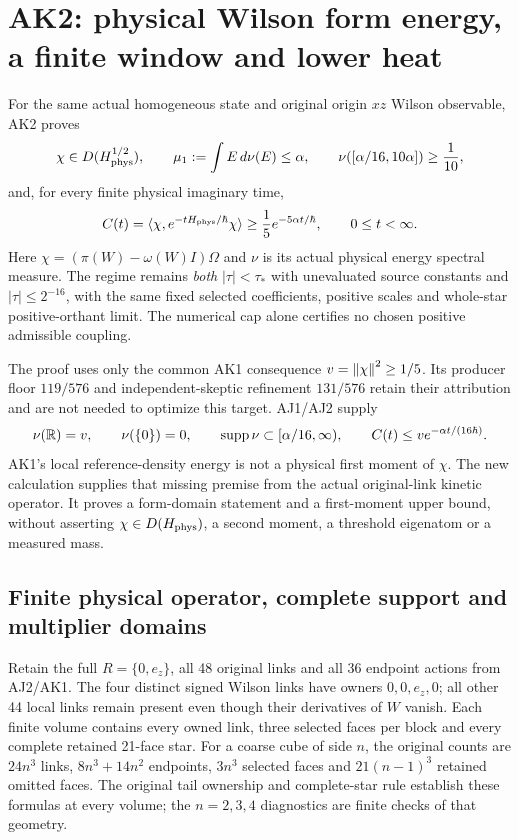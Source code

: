 \section{AK2: physical Wilson form energy, a finite window and lower heat\workstar}
\label{sec:ak2}
For the same actual homogeneous state and original origin $xz$ Wilson observable, AK2 proves
\begin{equation}
 \chi\in D(H_{\rm phys}^{1/2}),\qquad
 \mu_1:=\int E\,d\nu(E)\le\alpha,\qquad
 \nu([\alpha/16,10\alpha])\ge\frac1{10},
 \label{eq:ak2-targets}
\end{equation}
and, for every finite physical imaginary time,
\begin{equation}
 C(t)=\langle\chi,e^{-tH_{\rm phys}/\hbar}\chi\rangle
 \ge\frac15e^{-5\alpha t/\hbar},\qquad0\le t<\infty.
 \label{eq:ak2-lower-heat}
\end{equation}
Here $\chi=(\pi(W)-\omega(W)I)\Omega$ and $\nu$ is its actual physical energy spectral measure. The regime remains \emph{both} $|\tau|<\tau_*$ with unevaluated source constants and $|\tau|\le2^{-16}$, with the same fixed selected coefficients, positive scales and whole-star positive-orthant limit. The numerical cap alone certifies no chosen positive admissible coupling.

The proof uses only the common AK1 consequence $v=\left\lVert\chi\right\rVert^2\ge1/5$. Its producer floor $119/576$ and independent-skeptic refinement $131/576$ retain their attribution and are not needed to optimize this target. AJ1/AJ2 supply
\begin{equation}
 \nu(\mathbb R)=v,\qquad\nu(\{0\})=0,\qquad
 \operatorname{supp}\nu\subset[\alpha/16,\infty),\qquad
 C(t)\le v e^{-\alpha t/(16\hbar)}.
 \label{eq:ak2-inherited}
\end{equation}
AK1's local reference-density energy is not a physical first moment of $\chi$. The new calculation supplies that missing premise from the actual original-link kinetic operator. It proves a form-domain statement and a first-moment upper bound, without asserting $\chi\in D(H_{\rm phys})$, a second moment, a threshold eigenatom or a measured mass.

\subsection{Finite physical operator, complete support and multiplier domains}
Retain the full $R=\{0,e_z\}$, all 48 original links and all 36 endpoint actions from AJ2/AK1. The four distinct signed Wilson links have owners $0,0,e_z,0$; all other 44 local links remain present even though their derivatives of $W$ vanish. Each finite volume contains every owned link, three selected faces per block and every complete retained 21-face star. For a coarse cube of side $n$, the original counts are $24n^3$ links, $8n^3+14n^2$ endpoints, $3n^3$ selected faces and $21(n-1)^3$ retained omitted faces. The original tail ownership and complete-star rule establish these formulas at every volume; the $n=2,3,4$ diagnostics are finite checks of that geometry.

